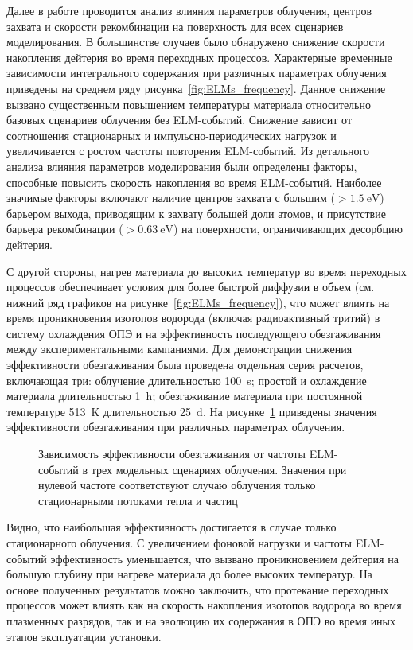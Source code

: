 Далее в работе проводится анализ влияния параметров облучения, центров захвата и скорости рекомбинации на поверхность для всех сценариев моделирования. В большинстве случаев было обнаружено снижение скорости накопления дейтерия во время переходных процессов. Характерные временные зависимости интегрального содержания при различных параметрах облучения приведены на среднем ряду рисунка~\cref{fig:ELMs_frequency}. Данное снижение вызвано существенным повышением температуры материала относительно базовых сценариев облучения без ELM-событий. Снижение зависит от соотношения стационарных и импульсно-периодических нагрузок и увеличивается с ростом частоты повторения ELM-событий. Из детального анализа влияния параметров моделирования были определены факторы, способные повысить скорость накопления во время ELM-событий. Наиболее значимые факторы включают наличие центров захвата с большим (\( >\SI{1.5}{\electronvolt} \)) барьером выхода, приводящим к захвату большей доли атомов, и присутствие барьера рекомбинации (\( >\SI{0.63}{\electronvolt} \)) на поверхности, ограничивающих десорбцию дейтерия.

С другой стороны, нагрев материала до высоких температур во время переходных процессов обеспечивает условия для более быстрой диффузии в объем (см. нижний ряд графиков на рисунке~\cref{fig:ELMs_frequency}), что может влиять на время проникновения изотопов водорода (включая радиоактивный тритий) в систему охлаждения ОПЭ и на эффективность последующего обезгаживания между экспериментальными кампаниями. Для демонстрации снижения эффективности обезгаживания была проведена отдельная серия расчетов, включающая три: облучение длительностью \SI{100}{\second}; простой и охлаждение материала длительностью \SI{1}{\hour}; обезгаживание материала при постоянной температуре \SI{513}{\kelvin} длительностью \SI{25}{\day}. На рисунке~\cref{fig:baking_efficiency} приведены значения эффективности обезгаживания при различных параметрах облучения.

\begin{figure}[ht]
	\caption{Зависимость эффективности обезгаживания от частоты ELM-событий в трех модельных сценариях облучения. Значения при нулевой частоте соответствуют случаю облучения только стационарными потоками тепла и частиц}\label{fig:baking_efficiency}
\end{figure}
Видно, что наибольшая эффективность достигается в случае только стационарного облучения. С увеличением фоновой нагрузки и частоты ELM-событий эффективность уменьшается, что вызвано проникновением дейтерия на большую глубину при нагреве материала до более высоких температур. На основе полученных результатов можно заключить, что протекание переходных процессов может влиять как на скорость накопления изотопов водорода во время плазменных разрядов, так и на эволюцию их содержания в ОПЭ во время иных этапов эксплуатации установки.  

